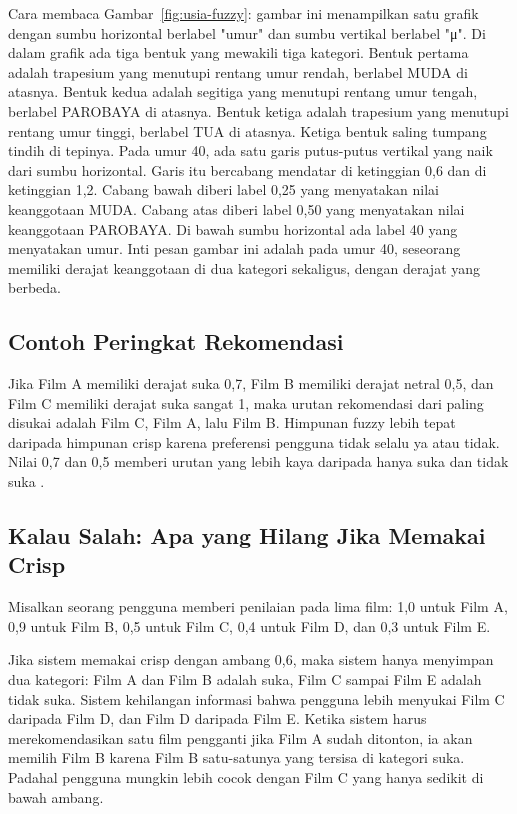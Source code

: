 \documentclass[11pt,a4paper]{article}
\begin{document}
Cara membaca Gambar~\ref{fig:usia-fuzzy}: gambar ini menampilkan satu grafik dengan sumbu horizontal berlabel "umur" dan sumbu vertikal berlabel "μ". Di dalam grafik ada tiga bentuk yang mewakili tiga kategori. Bentuk pertama adalah trapesium yang menutupi rentang umur rendah, berlabel MUDA di atasnya. Bentuk kedua adalah segitiga yang menutupi rentang umur tengah, berlabel PAROBAYA di atasnya. Bentuk ketiga adalah trapesium yang menutupi rentang umur tinggi, berlabel TUA di atasnya. Ketiga bentuk saling tumpang tindih di tepinya. Pada umur 40, ada satu garis putus-putus vertikal yang naik dari sumbu horizontal. Garis itu bercabang mendatar di ketinggian 0,6 dan di ketinggian 1,2. Cabang bawah diberi label 0,25 yang menyatakan nilai keanggotaan MUDA. Cabang atas diberi label 0,50 yang menyatakan nilai keanggotaan PAROBAYA. Di bawah sumbu horizontal ada label 40 yang menyatakan umur. Inti pesan gambar ini adalah pada umur 40, seseorang memiliki derajat keanggotaan di dua kategori sekaligus, dengan derajat yang berbeda.

\subsection{Contoh Peringkat Rekomendasi}

Jika Film A memiliki derajat suka 0,7, Film B memiliki derajat netral 0,5, dan Film C memiliki derajat suka sangat 1, maka urutan rekomendasi dari paling disukai adalah Film C, Film A, lalu Film B. Himpunan fuzzy lebih tepat daripada himpunan crisp karena preferensi pengguna tidak selalu ya atau tidak. Nilai 0,7 dan 0,5 memberi urutan yang lebih kaya daripada hanya suka dan tidak suka \cite{zadeh}.

\subsection{Kalau Salah: Apa yang Hilang Jika Memakai Crisp}

Misalkan seorang pengguna memberi penilaian pada lima film: 1,0 untuk Film A, 0,9 untuk Film B, 0,5 untuk Film C, 0,4 untuk Film D, dan 0,3 untuk Film E.

Jika sistem memakai crisp dengan ambang 0,6, maka sistem hanya menyimpan dua kategori: Film A dan Film B adalah suka, Film C sampai Film E adalah tidak suka. Sistem kehilangan informasi bahwa pengguna lebih menyukai Film C daripada Film D, dan Film D daripada Film E. Ketika sistem harus merekomendasikan satu film pengganti jika Film A sudah ditonton, ia akan memilih Film B karena Film B satu-satunya yang tersisa di kategori suka. Padahal pengguna mungkin lebih cocok dengan Film C yang hanya sedikit di bawah ambang.
\end{document}
